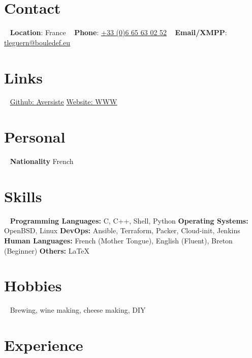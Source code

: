 \documentclass[]{friggeri-cv} %
\begin{document}


\begin{aside} %
\section{Contact}
~
\textbf{Location}: France
~
\textbf{Phone}: \href{tel:0033665630252}{\underline{+33 (0)6 65 63 02 52}}
~
\textbf{Email/XMPP}: \href{mailto:tleguern@bouledef.eu}{\underline{tleguern@bouledef.eu}}
\section {Links}
~
\href{https://github.com/Aversiste}{Github: \underline{Aversiste}}
\href{https://www.bouledef.eu/~tleguern}{Website: \underline{WWW}}
\section{Personal}
~
\textbf{Nationality}
French
\section{Skills}
~
\textbf{Programming Languages:} C, C++, Shell, Python
\textbf{Operating Systems:} OpenBSD, Linux
\textbf{DevOps:} Ansible, Terraform, Packer, Cloud-init, Jenkins
\textbf{Human Languages:} French (Mother Tongue), English (Fluent), Breton (Beginner)
\textbf{Others:} \LaTeX
\section{Hobbies}
~
Brewing, wine making, cheese making, DIY
\end{aside}


\section{Experience}
\end{document}
